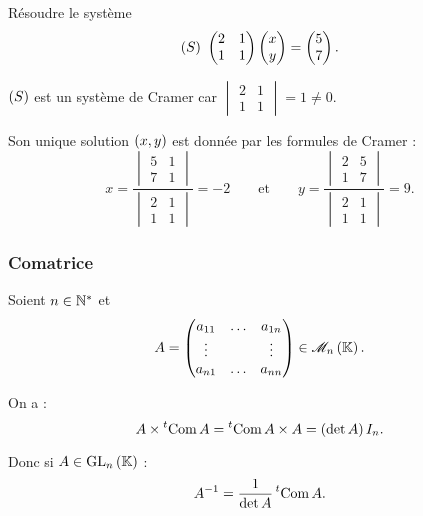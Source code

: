 \begin{exoex}
Résoudre le système \[\left(S\right)~\begin{pmatrix}
2 & 1 \\
1 & 1
\end{pmatrix}\begin{pmatrix}x\\y\end{pmatrix}=\begin{pmatrix}5\\7\end{pmatrix}.\]
\end{exoex}

\begin{corr}
\(\left(S\right)\) est un système de Cramer car \(\begin{vmatrix}
2 & 1 \\
1 & 1
\end{vmatrix}=1\not=0\).

Son unique solution \(\left(x,y\right)\) est donnée par les formules de Cramer : \[x=\dfrac{\begin{vmatrix}5 & 1 \\ 7 & 1\end{vmatrix}}{\begin{vmatrix}2 & 1 \\ 1 & 1\end{vmatrix}}=-2\qquad\text{et}\qquad y=\dfrac{\begin{vmatrix}2 & 5 \\ 1 & 7\end{vmatrix}}{\begin{vmatrix}2 & 1 \\ 1 & 1\end{vmatrix}}=9.\]
\end{corr}

\subsubsection{Comatrice}

\begin{prop}
Soient \(n\in\mathbb{N}^*\) et \[A=\begin{pmatrix}
a_{11} & \dots & a_{1n} \\
\vdots &  & \vdots \\
a_{n1} & \dots & a_{nn}
\end{pmatrix}\in\M{n}.\]

On a : \[A\times\prescript{t}{}{\operatorname{Com}A}=\prescript{t}{}{\operatorname{Com}A}\times A=\left(\det A\right)I_n.\]

Donc si \(A\in\GL{n}\) : \[A^{-1}=\dfrac{1}{\det A}\prescript{t}{}{\operatorname{Com}A}.\]
\end{prop}

